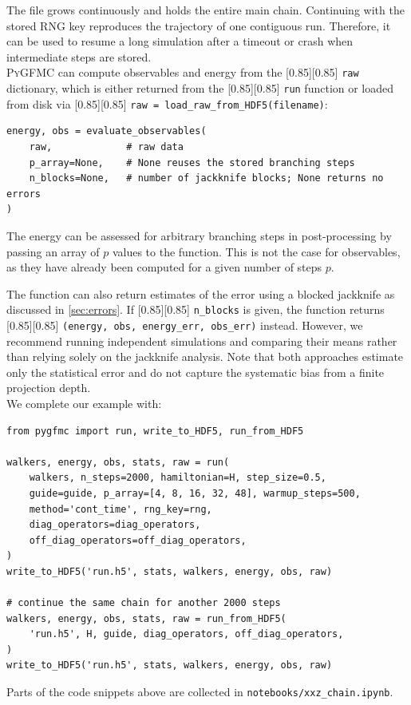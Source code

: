 \documentclass{SciPost}
\newcommand{\pyinline}[1]{\begingroup\setlength{\fboxsep}{0pt}%
  \colorbox{gray!15}{\raisebox{0pt}[0.85\ht\strutbox][0.85\dp\strutbox]{%
    \hspace{1pt}\lstinline{#1}\hspace{1pt}}}\endgroup}
\providecommand{\PyGFMC}{\textsc{PyGFMC}}
\begin{document}
The file grows continuously and holds the entire main chain. Continuing with the stored RNG key reproduces the trajectory of one contiguous run.
%
Therefore, it can be used to resume a long simulation after a timeout or crash when intermediate steps are stored.\\

\PyGFMC{} can compute observables and energy from the \pyinline{raw} dictionary, which is either returned from the \pyinline{run} function or loaded from disk via \pyinline{raw = load_raw_from_HDF5(filename)}:
\begin{lstlisting}
energy, obs = evaluate_observables(
    raw,             # raw data
    p_array=None,    # None reuses the stored branching steps
    n_blocks=None,   # number of jackknife blocks; None returns no errors
)
\end{lstlisting}
The energy can be assessed for arbitrary branching steps in post-processing by passing an array of $p$ values to the function.
%
This is not the case for observables, as they have already been computed for a given number of steps $p$.


The function can also return estimates of the error using a blocked jackknife as discussed in \autoref{sec:errors}.
%
If \pyinline{n_blocks} is given, the function returns \pyinline{(energy, obs, energy_err, obs_err)} instead.
%
However, we recommend running independent simulations and comparing their means rather than relying solely on the jackknife analysis.
%
Note that both approaches estimate only the statistical error and do not capture the systematic bias from a finite projection depth.\\

We complete our example with:
\begin{lstlisting}
from pygfmc import run, write_to_HDF5, run_from_HDF5

walkers, energy, obs, stats, raw = run(
    walkers, n_steps=2000, hamiltonian=H, step_size=0.5,
    guide=guide, p_array=[4, 8, 16, 32, 48], warmup_steps=500,
    method='cont_time', rng_key=rng,
    diag_operators=diag_operators,
    off_diag_operators=off_diag_operators,
)
write_to_HDF5('run.h5', stats, walkers, energy, obs, raw)

# continue the same chain for another 2000 steps
walkers, energy, obs, stats, raw = run_from_HDF5(
    'run.h5', H, guide, diag_operators, off_diag_operators,
)
write_to_HDF5('run.h5', stats, walkers, energy, obs, raw)
\end{lstlisting}
Parts of the code snippets above are collected in \texttt{notebooks/xxz\_chain.ipynb}.
\end{document}
